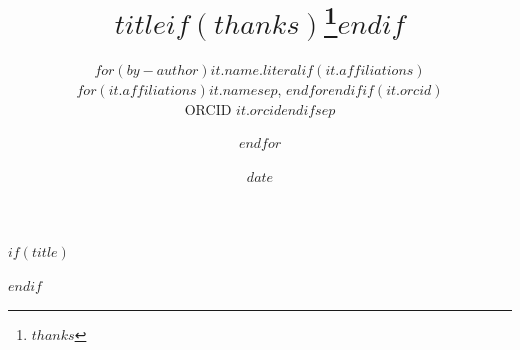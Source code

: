 $if(title)$
\title{$title$$if(thanks)$\thanks{$thanks$}$endif$}
$endif$
\author{$for(by-author)$$it.name.literal$$if(it.affiliations)$\\ {\small $for(it.affiliations)$$it.name$$sep$, $endfor$}$endif$$if(it.orcid)$\\ {\small ORCID \href{https://orcid.org/$it.orcid$}{$it.orcid$}}$endif$$sep$ \and $endfor$}
\date{$date$}
